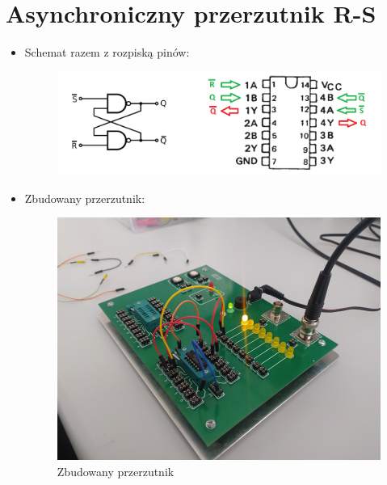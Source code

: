 \chapter{Asynchroniczny przerzutnik R-S}

\begin{itemize}
    \item Schemat razem z rozpiską pinów:
        \begin{figure}[H]
            \centering
            \includegraphics[width=\textwidth]{img/schemes_with_pins/przerzutnik_w_pins.png}
            \label{przerzutnik:schemat_w_pins}
        \end{figure}
    \item Zbudowany przerzutnik:
        \begin{figure}[H]
            \centering
            \includegraphics[width=\textwidth]{img/przerzutnik/1652306732322_scaled.png}
            \caption{Zbudowany przerzutnik}
            \label{przerzutnik:zbudowany}
        \end{figure}
        
\pagebreak


\end{itemize}
